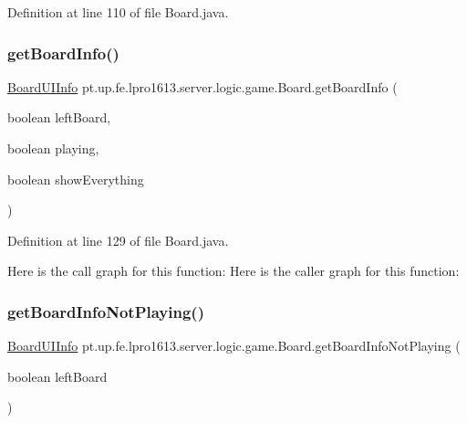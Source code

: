 Definition at line 110 of file Board.\+java.

\hypertarget{classpt_1_1up_1_1fe_1_1lpro1613_1_1server_1_1logic_1_1game_1_1_board_a85a7b77f160e088eae0cb3dc1144c919}{}\label{classpt_1_1up_1_1fe_1_1lpro1613_1_1server_1_1logic_1_1game_1_1_board_a85a7b77f160e088eae0cb3dc1144c919} 
\subsubsection{\texorpdfstring{get\+Board\+Info()}{getBoardInfo()}}
{\footnotesize\ttfamily \hyperlink{classpt_1_1up_1_1fe_1_1lpro1613_1_1sharedlib_1_1tuples_1_1_board_u_i_info}{Board\+U\+I\+Info} pt.\+up.\+fe.\+lpro1613.\+server.\+logic.\+game.\+Board.\+get\+Board\+Info (\begin{DoxyParamCaption}\item[{boolean}]{left\+Board,  }\item[{boolean}]{playing,  }\item[{boolean}]{show\+Everything }\end{DoxyParamCaption})}



Definition at line 129 of file Board.\+java.

Here is the call graph for this function\+:
Here is the caller graph for this function\+:
\hypertarget{classpt_1_1up_1_1fe_1_1lpro1613_1_1server_1_1logic_1_1game_1_1_board_aedd40d2273ef056df4cd268da4ca383f}{}\label{classpt_1_1up_1_1fe_1_1lpro1613_1_1server_1_1logic_1_1game_1_1_board_aedd40d2273ef056df4cd268da4ca383f} 
\subsubsection{\texorpdfstring{get\+Board\+Info\+Not\+Playing()}{getBoardInfoNotPlaying()}}
{\footnotesize\ttfamily \hyperlink{classpt_1_1up_1_1fe_1_1lpro1613_1_1sharedlib_1_1tuples_1_1_board_u_i_info}{Board\+U\+I\+Info} pt.\+up.\+fe.\+lpro1613.\+server.\+logic.\+game.\+Board.\+get\+Board\+Info\+Not\+Playing (\begin{DoxyParamCaption}\item[{boolean}]{left\+Board }\end{DoxyParamCaption})}



